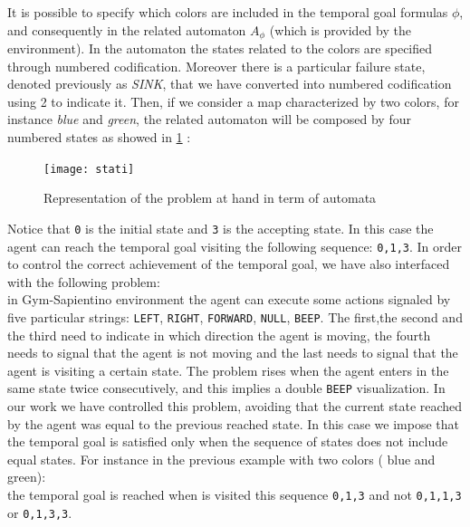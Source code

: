 \documentclass{article}
\begin{document}
\noindent
It is possible to specify which colors are included in the temporal goal formulas $\phi$, and consequently in the related automaton $A_\phi$ (which is provided by the environment). 
In the automaton the states related to the colors are specified through numbered codification. Moreover there is a particular failure state, denoted previously as \textit{SINK}, that we have converted into numbered codification using 2 to indicate it. Then, if we consider a map characterized by two colors, for instance \textit{blue} and \textit{green}, the related automaton will be composed by four numbered states as showed in \ref{fig:stati} :

\vspace{2em}
\begin{figure}[H]
\centering
\texttt{[image: stati]}
\caption{Representation of the problem at hand in term of automata}
\label{fig:stati}
\end{figure}

\noindent
Notice that \texttt{0} is the initial state and \texttt{3} is the accepting state.
In this case the agent can reach the temporal goal visiting the following sequence: \texttt{0,1,3}. In order to control the correct achievement of the temporal goal, we have also interfaced with the following problem:\\
in Gym-Sapientino environment the agent can execute some actions signaled by five particular  strings: \texttt{LEFT}, \texttt{RIGHT}, \texttt{FORWARD}, \texttt{NULL}, \texttt{BEEP}. The first,the second and the third need to indicate in which direction the agent is moving, the fourth needs to signal that the agent is not moving and the last needs to signal that the agent is visiting a certain state.
The problem rises when the agent enters in the same state twice consecutively, and this implies a double \texttt{BEEP} visualization. In our work we have controlled this problem, avoiding that the current state reached by the agent was equal to the previous reached state. In this case we impose that the temporal goal is satisfied only when the sequence of states does not include equal states. For instance in the previous example with two colors ( blue and green):\\
the temporal goal is reached when is visited this sequence \texttt{0,1,3} and not \texttt{0,1,1,3} or \texttt{0,1,3,3}.
\end{document}
